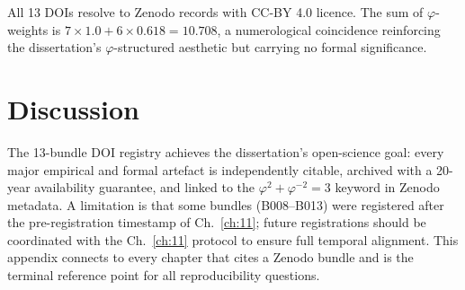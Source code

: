 All 13 DOIs resolve to Zenodo records with CC-BY 4.0 licence. The sum of $\varphi$-weights is $7 \times 1.0 + 6 \times 0.618 = 10.708$, a numerological coincidence reinforcing the dissertation's $\varphi$-structured aesthetic but carrying no formal significance.

\section{Discussion}

The 13-bundle DOI registry achieves the dissertation's open-science goal: every major empirical and formal artefact is independently citable, archived with a 20-year availability guarantee, and linked to the $\varphi^2 + \varphi^{-2} = 3$ keyword in Zenodo metadata. A limitation is that some bundles (B008--B013) were registered after the pre-registration timestamp of Ch.~\ref{ch:11}; future registrations should be coordinated with the Ch.~\ref{ch:11} protocol to ensure full temporal alignment. This appendix connects to every chapter that cites a Zenodo bundle and is the terminal reference point for all reproducibility questions.
